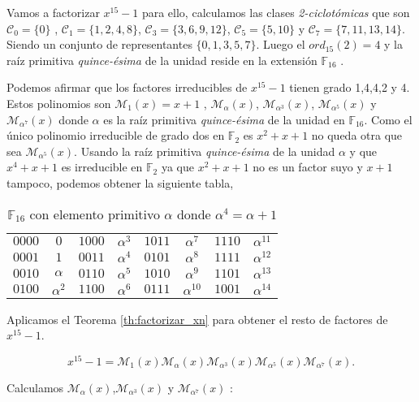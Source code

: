  \begin{exampleth}
Vamos a factorizar $x^{15}-1$ para ello, calculamos las clases \textit{2-ciclotómicas} que son $\mathcal{C}_0 = \{ 0 \}$ , $\mathcal{C}_1 = \{ 1,2,4,8 \}$, $\mathcal{C}_3 = \{ 3,6,9,12 \}$, $\mathcal{C}_5 = \{ 5,10 \}$ y $\mathcal{C}_7 = \{ 7,11,13,14 \}$. Siendo un conjunto de representantes $\{ 0,1,3,5,7 \}$. Luego el $ord_{15}(2) = 4$ y la  raíz primitiva \textit{quince-ésima} de la unidad reside en la extensión $\mathbb{F}_{16}$ .


Podemos afirmar que los factores irreducibles de $x^{15}-1$ tienen grado 1,4,4,2 y 4. Estos polinomios son $\mathcal{M}_{1}(x) = x+1 $ , $\mathcal{M}_{\alpha}(x)$, $\mathcal{M}_{\alpha^3}(x)$, $\mathcal{M}_{\alpha^5}(x)$ y $\mathcal{M}_{\alpha^7}(x)$ donde $\alpha$ es la raíz primitiva \textit{quince-ésima} de la unidad en $\mathbb{F}_{16}$. Como el único polinomio irreducible de grado dos en $\mathbb{F}_2$ es $x^2+x+1$ no queda otra que sea $\mathcal{M}_{\alpha^5}(x)$.  Usando la raíz primitiva \textit{quince-ésima} de la unidad $\alpha$ y que $x^4 + x +1$ es irreducible en $\mathbb{F}_2$ ya que $x^2+x+1$ no es un factor suyo y $x+1$ tampoco, podemos obtener la siguiente tabla,

\begin{table}[H]
\begin{tabular}{ c | c | c | c | c | c | c | c }

	 
$0000$ & $0$  & $1000$ & $\alpha^3$ & $1011$ & $\alpha^7$ & $1110$ & $\alpha^{11}$ \\$0001$ & $1$  & $0011$ & $\alpha^4$ & $0101$ & $\alpha^8$ & $1111$ & $\alpha^{12}$ \\
$0010$ & $\alpha$  & $0110$ & $\alpha^5$ & $1010$ & $\alpha^9$ & $1101$ & $\alpha^{13}$ \\
$0100$ & $\alpha^2$  & $1100$ & $\alpha^6$ & $0111$ & $\alpha^{10}$ & $1001$ & $\alpha^{14}$ \\
	\end{tabular}
\caption{$\mathbb{F}_{16}$ con elemento primitivo $\alpha$ donde $\alpha^4 = \alpha +1$}
\end{table}
 
Aplicamos el Teorema \ref{th:factorizar_xn} para obtener el resto de factores de $x^{15}-1$.

\[ x^{15}-1 = \mathcal{M}_{1}(x) \mathcal{M}_{\alpha}(x) \mathcal{M}_{\alpha^3}(x) \mathcal{M}_{\alpha^5}(x) \mathcal{M}_{\alpha^7}(x). \]
 
 Calculamos $ \mathcal{M}_{\alpha}(x)$,$ \mathcal{M}_{\alpha^3}(x)$ y $ \mathcal{M}_{\alpha^7}(x)$ :
 

\end{exampleth}
